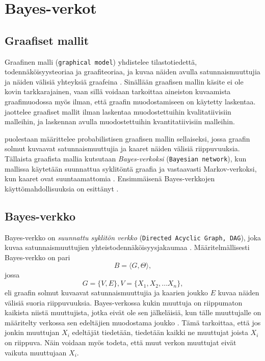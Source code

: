 \chapter{Bayes-verkot\label{bayes}} 

\section{Graafiset mallit} 
Graafinen malli (\texttt{graphical model}) yhdistelee tilastotiedettä, todennäköisyysteoriaa ja graafiteoriaa, ja kuvaa näiden avulla satunnaismuuttujia ja näiden välisiä yhteyksiä graafeina \citep{jordan_graphical_2004}. Sinällään graafisen mallin käsite ei ole kovin tarkkarajainen, vaan sillä voidaan tarkoittaa aineiston kuvaamista graafimuodossa myös ilman, että graafin muodostamiseen on käytetty laskentaa. \citet{ramsahai_connecting_2020} jaottelee graafiset mallit ilman laskentaa muodostettuihin kvalitatiivisiin malleihin, ja laskennan avulla muodostettuihin kvantitatiivisiin malleihin.  

\citet{jordan_graphical_2004} puolestaan määrittelee probabilistisen graafisen mallin sellaiseksi, jossa graafin solmut kuvaavat satunnaismuuttujia ja kaaret näiden välisiä riippuvuuksia. Tällaista graafista mallia kutsutaan \emph{Bayes-verkoksi} (\texttt{Bayesian network}), kun mallissa käytetään suunnattua syklitöntä graafia ja vastaavasti Markov-verkoksi, kun kaaret ovat suuntaamattomia \citep{ruggeri_bayesian_2008}. Ensimmäisenä Bayes-verkkojen käyttömahdollisuuksia on esittänyt \citet{pearl_fusion_1986}. 

\section{Bayes-verkko}\label{bayes-verkko} 

Bayes-verkko on \emph{suunnattu syklitön verkko} (\texttt{Directed Acyclic Graph, DAG}), joka kuvaa satunnaismuuttujien yhteistodennäköisyysjakaumaa \citep{ruggeri_bayesian_2008}. Määritelmällisesti Bayes-verkko on pari  
$$ 
    B = \langle G, \Theta \rangle, 
$$ 
jossa  
$$ 
    G = \{V, E\}, V = \{X_1, X_2,\ldots X_n\},
$$  
eli graafin solmut kuvaavat satunnaismuuttujia ja kaarien joukko $E$ kuvaa näiden välisiä suoria riippuvuuksia. Bayes-verkossa kukin muuttuja on riippumaton kaikista niistä muuttujista, jotka eivät ole sen jälkeläisiä, kun tälle muuttujalle on määritelty verkossa sen edeltäjien muodostama joukko \citep{ruggeri_bayesian_2008}. Tämä tarkoittaa, että jos jonkin muuttujan $X_i$ edeltäjät tiedetään, tiedetään kaikki ne muuttujat joista $X_i$ on riippuva. Näin voidaan myös todeta, että muut verkon muuttujat eivät vaikuta muuttujaan $X_i$.  

